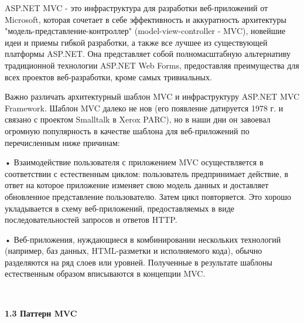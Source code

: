 \documentclass[14pt,a4paper]{extreport}
\begin{document}
	\parindent=1cm ASP.NET MVC - это инфраструктура для разработки веб-приложений от Microsoft, которая сочетает в себе эффективность и аккуратность архитектуры "модель-представление-контроллер" (model-view-controller - MVC), новейшие идеи и приемы гибкой разработки, а также все лучшее из существующей платформы ASP.NET. Она представляет собой полномасштабную альтернативу традиционной технологии ASP.NET Web Forms, предоставляя преимущества для всех проектов веб-разработки, кроме самых тривиальных.\par
	Важно различать архитектурный шаблон MVC и инфраструктуру ASP.NET MVC Framework. Шаблон MVC далеко не нов (его появление датируется 1978 г. и связано с проектом Smalltalk в Xerox PARC), но в наши дни он завоевал огромную популярность в качестве шаблона для веб-приложений по перечисленным ниже причинам:\par
	• Взаимодействие пользователя с приложением MVC осуществляется в соответствии с естественным циклом: пользователь предпринимает действие, в ответ на которое приложение изменяет свою модель данных и доставляет обновленное представление пользователю. Затем цикл повторяется. Это хорошо укладывается в схему веб-приложений, предоставляемых в виде последовательностей запросов и ответов HTTP.\par
	• Веб-приложения, нуждающиеся в комбинировании нескольких технологий (например, баз данных, HTML-разметки и исполняемого кода), обычно разделяются на ряд слоев или уровней. Полученные в результате шаблоны естественным образом вписываются в концепции MVC.\par
	~\\

	\textbf{1.3 Паттерн MVC}
\end{document}
